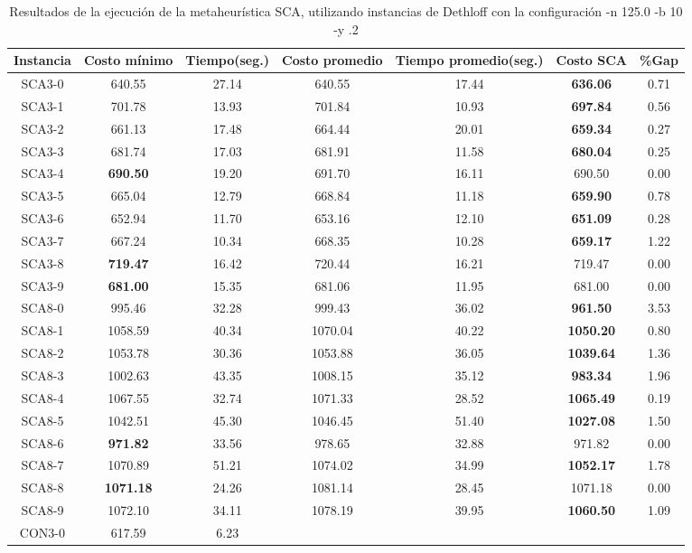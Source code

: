 \begin{table}[ht]
\caption{Resultados de la ejecución de la metaheurística SCA, utilizando instancias de Dethloff con la configuración -n 125.0 -b 10 -y .2}
\centering
\small
\begin{tabular}{c c c c c c c}
\hline\hline
Instancia & Costo mínimo & Tiempo(seg.) & Costo promedio & Tiempo promedio(seg.) & Costo SCA & \%Gap \\ [0.5ex]
\hline
SCA3-0 & 640.55 & 27.14 & 
640.55 & 17.44 & \bf{636.06} & 
0.71\\SCA3-1 & 701.78 & 13.93 & 
701.84 & 10.93 & \bf{697.84} & 
0.56\\SCA3-2 & 661.13 & 17.48 & 
664.44 & 20.01 & \bf{659.34} & 
0.27\\SCA3-3 & 681.74 & 17.03 & 
681.91 & 11.58 & \bf{680.04} & 
0.25\\SCA3-4 & \bf{690.50} & 19.20 & 
691.70 & 16.11 & 690.50 & 0.00\\
SCA3-5 & 665.04 & 12.79 & 
668.84 & 11.18 & \bf{659.90} & 
0.78\\SCA3-6 & 652.94 & 11.70 & 
653.16 & 12.10 & \bf{651.09} & 
0.28\\SCA3-7 & 667.24 & 10.34 & 
668.35 & 10.28 & \bf{659.17} & 
1.22\\SCA3-8 & \bf{719.47} & 16.42 & 
720.44 & 16.21 & 719.47 & 0.00\\
SCA3-9 & \bf{681.00} & 15.35 & 
681.06 & 11.95 & 681.00 & 0.00\\
SCA8-0 & 995.46 & 32.28 & 
999.43 & 36.02 & \bf{961.50} & 
3.53\\SCA8-1 & 1058.59 & 40.34 & 
1070.04 & 40.22 & \bf{1050.20} & 
0.80\\SCA8-2 & 1053.78 & 30.36 & 
1053.88 & 36.05 & \bf{1039.64} & 
1.36\\SCA8-3 & 1002.63 & 43.35 & 
1008.15 & 35.12 & \bf{983.34} & 
1.96\\SCA8-4 & 1067.55 & 32.74 & 
1071.33 & 28.52 & \bf{1065.49} & 
0.19\\SCA8-5 & 1042.51 & 45.30 & 
1046.45 & 51.40 & \bf{1027.08} & 
1.50\\SCA8-6 & \bf{971.82} & 33.56 & 
978.65 & 32.88 & 971.82 & 0.00\\
SCA8-7 & 1070.89 & 51.21 & 
1074.02 & 34.99 & \bf{1052.17} & 
1.78\\SCA8-8 & \bf{1071.18} & 24.26 & 
1081.14 & 28.45 & 1071.18 & 0.00\\
SCA8-9 & 1072.10 & 34.11 & 
1078.19 & 39.95 & \bf{1060.50} & 
1.09\\CON3-0 & 617.59 & 6.23 & 

\end{tabular}
\end{table}
